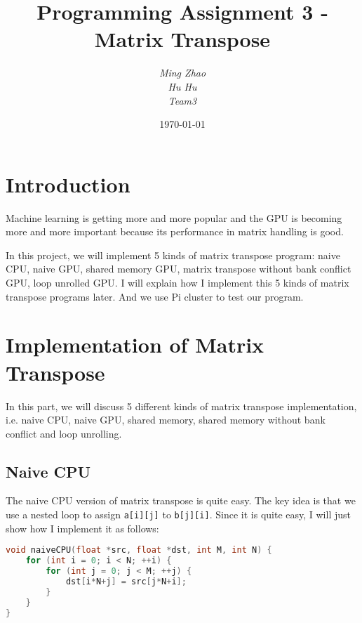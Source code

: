 \documentclass{article}
\begin{document}
\title{Programming Assignment 3 - Matrix Transpose}
\author{\textit{Ming Zhao}\\\textit{Hu Hu}\\\textit{Team3}}
\date{\today}
{\let\newpage\relax\maketitle}
\maketitle

\section{Introduction}
\quad Machine learning is getting more and more popular and the GPU is becoming more and more important because its performance in matrix handling is good.

In this project, we will implement 5 kinds of matrix transpose program: naive CPU, naive GPU, shared memory GPU,  matrix transpose without bank conflict GPU, loop unrolled GPU. I will explain how I implement this 5 kinds of matrix transpose programs later. And we use Pi cluster to test our program.

\section{Implementation of Matrix Transpose}
In this part, we will discuss 5 different kinds of matrix transpose implementation, i.e. naive CPU, naive GPU, shared memory, shared memory without bank conflict and loop unrolling.
\subsection{Naive CPU}
The naive CPU version of matrix transpose is quite easy. The key idea is that we use a nested loop to assign \verb|a[i][j]| to \verb|b[j][i]|. Since it is quite easy, I will just show how I implement it as follows:
\begin{lstlisting}[language=C, caption=naive CPU]
void naiveCPU(float *src, float *dst, int M, int N) {   
    for (int i = 0; i < N; ++i) {
        for (int j = 0; j < M; ++j) {
	        dst[i*N+j] = src[j*N+i];
        }
    }
}
\end{lstlisting}
\end{document}
